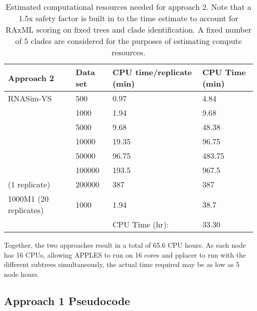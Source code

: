 \documentclass[10pt]{article}
\begin{document}
\begin{table}[h]
\centering
\begin{tabular}{llll}
\hline
Approach 2             & Data set & CPU time/replicate (min) & CPU Time (min) \\ \hline
RNASim-VS              & 500      & 0.97                   & 4.84         \\
                       & 1000     & 1.94                    & 9.68          \\
                       & 5000     & 9.68                    & 48.38         \\
                       & 10000    & 19.35                    & 96.75          \\
                       & 50000    & 96.75                    & 483.75         \\
                       & 100000   & 193.5                    & 967.5          \\
        (1 replicate)  & 200000   & 387                      & 387            \\
1000M1 (20 replicates) & 1000     & 1.94                    & 38.7           \\
                       &          & CPU Time (hr):           & 33.30      \\ \hline
\end{tabular}
\caption{
  Estimated computational resources needed for approach 2.
  Note that a 1.5x safety factor is built in to the time estimate
  to account for RAxML scoring on fixed trees and clade identification.
  A fixed number of 5 clades are considered for the purposes
  of estimating compute resources.
  }

\label{table:approach2-compute}
\end{table}

Together, the two approaches result in a total of 65.6 CPU hours. As
each node has 16 CPUs, allowing APPLES to run on 16 cores and pplacer to
run with the different subtrees simultaneously, the actual time required
may be as low as 5 node hours.

\subsection{Approach 1 Pseudocode}
\end{document}
